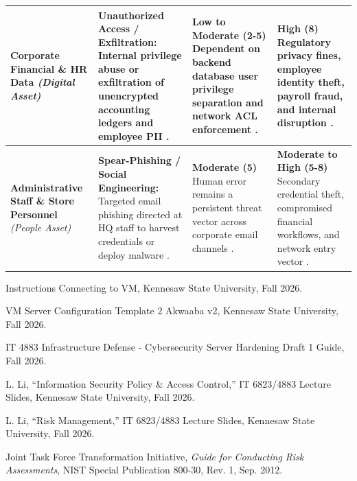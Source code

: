 \documentclass[10pt,a4paper]{article}
\begin{document}
\begin{table}[H]
\begin{tabular}{|L{3.2cm}|L{4.2cm}|L{4.0cm}|L{4.2cm}|}
\textbf{Corporate Financial \& HR Data} \newline \textit{(Digital Asset)} & 
\textbf{Unauthorized Access / Exfiltration:} Internal privilege abuse or exfiltration of unencrypted accounting ledgers and employee PII \cite{AkwaabaConfig, RiskSlides}. & 
\textbf{Low to Moderate (2-5)} \newline Dependent on backend database user privilege separation and network ACL enforcement \cite{AkwaabaConfig, RiskSlides}. & 
\textbf{High (8)} \newline Regulatory privacy fines, employee identity theft, payroll fraud, and internal disruption \cite{Phase1Guide, RiskSlides}. \\ \hline

\textbf{Administrative Staff \& Store Personnel} \newline \textit{(People Asset)} & 
\textbf{Spear-Phishing / Social Engineering:} Targeted email phishing directed at HQ staff to harvest credentials or deploy malware \cite{AkwaabaConfig, RiskSlides}. & 
\textbf{Moderate (5)} \newline Human error remains a persistent threat vector across corporate email channels \cite{RiskSlides, RiskGuide}. & 
\textbf{Moderate to High (5-8)} \newline Secondary credential theft, compromised financial workflows, and network entry vector \cite{Phase1Guide, RiskSlides}. \\ \hline
\end{tabular}
\end{table}

\newpage

\begin{thebibliography}{99}

Instructions Connecting to VM, Kennesaw State University, Fall 2026.

VM Server Configuration Template 2 Akwaaba v2, Kennesaw State University, Fall 2026.

IT 4883 Infrastructure Defense - Cybersecurity Server Hardening Draft 1 Guide, Fall 2026.

L. Li, ``Information Security Policy \& Access Control,'' IT 6823/4883 Lecture Slides, Kennesaw State University, Fall 2026.

L. Li, ``Risk Management,'' IT 6823/4883 Lecture Slides, Kennesaw State University, Fall 2026.

Joint Task Force Transformation Initiative, \textit{Guide for Conducting Risk Assessments}, NIST Special Publication 800-30, Rev. 1, Sep. 2012.

\end{thebibliography}
\end{document}
